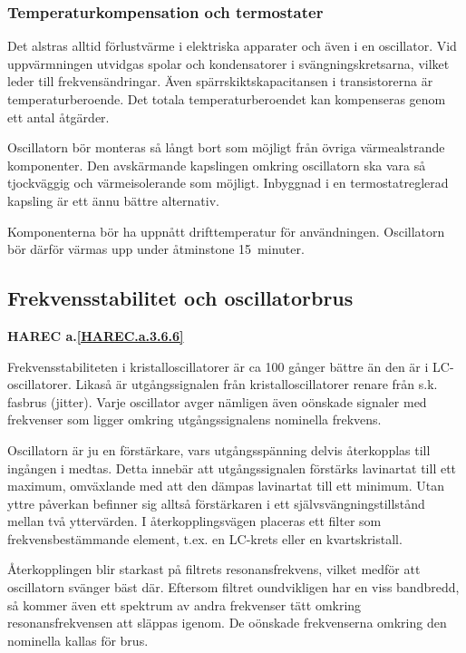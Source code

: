 \subsubsection{Temperaturkompensation och termostater}

Det alstras alltid förlustvärme i elektriska apparater och även i en
oscillator.
Vid uppvärmningen utvidgas spolar och kondensatorer i svängningskretsarna,
vilket leder till frekvensändringar.
Även spärrskiktskapacitansen i transistorerna är temperaturberoende.
Det totala temperaturberoendet kan kompenseras genom ett antal åtgärder.

Oscillatorn bör monteras så långt bort som möjligt från övriga
värmealstrande komponenter.
Den avskärmande kapslingen omkring oscillatorn ska vara så tjockväggig och
värmeisolerande som möjligt.
Inbyggnad i en termostatreglerad kapsling är ett ännu bättre alternativ.

Komponenterna bör ha uppnått drifttemperatur för användningen.
Oscillatorn bör därför värmas upp under åtminstone 15~minuter.

\subsection{Frekvensstabilitet och oscillatorbrus}
\textbf{HAREC a.\ref{HAREC.a.3.6.6}\label{myHAREC.a.3.6.6}}

Frekvensstabiliteten i kristalloscillatorer är ca 100 gånger bättre än
den är i LC-oscillatorer.
Likaså är utgångssignalen från kristalloscillatorer renare från s.k. fasbrus
(jitter).
Varje oscillator avger nämligen även oönskade signaler med frekvenser som
ligger omkring utgångssignalens nominella frekvens.

Oscillatorn är ju en förstärkare, vars utgångsspänning delvis
återkopplas till ingången i medtas.
Detta innebär att utgångssignalen förstärks lavinartat till ett maximum,
omväxlande med att den dämpas lavinartat till ett minimum.
Utan yttre påverkan befinner sig alltså förstärkaren i ett
självsvängningstillstånd mellan två yttervärden.
I återkopplingsvägen placeras ett filter som frekvensbestämmande
element, t.ex. en LC-krets eller en kvartskristall.

Återkopplingen blir starkast på filtrets resonansfrekvens, vilket
medför att oscillatorn svänger bäst där.
Eftersom filtret oundvikligen har en viss bandbredd, så kommer även ett
spektrum av andra frekvenser tätt omkring resonansfrekvensen att släppas
igenom.
De oönskade frekvenserna omkring den nominella kallas för brus.

